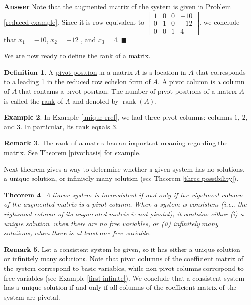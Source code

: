 \documentclass[12pt,letterpaper]{book}
\numberwithin{equation}{section}
\newtheorem{thm}{\textbf{Theorem}}[section]
\theoremstyle{definition}
\newtheorem{defi}[thm]{\textbf{Definition}}
\newtheorem{example}[thm]{\textbf{Example}}
\newtheorem{remark}[thm]{\textbf{Remark}}
\newenvironment{answer}{\noindent\textbf{Answer}}{\hfill$\blacksquare$\vspace{0.1in}}
\newcommand{\rank}{\operatorname{rank}}
\begin{document}
\begin{answer}
Note that the augmented matrix of the system is given in Problem \ref{reduced example}. Since it is row equivalent to $\left[\begin{array}{rrrr}1 & 0 & 0 & -10 \\ 0 & 1 & 0 & -12 \\ 0 & 0 & 1 & 4 \end{array}\right]$, we conclude that $x_1=-10$, $x_2=-12$ , and $x_3=4$.
\end{answer}

We are now ready to define the rank of a matrix.

\begin{defi}\label{rank def defi} A \underline{pivot position} in a matrix $A$ is
a location in $A$ that corresponds to a leading 1 in the reduced row
echelon form of $A$. A \underline{pivot column} is a
column of $A$ that contains a pivot position. The number of pivot positions of a matrix $A$ is
called the \underline{rank} of $A$ and denoted by
$\rank (A)$.
\end{defi}

\begin{example} In Example \ref{unique rref}, we had three pivot
columns: columns $1$, $2$, and $3$. In particular, its rank equals $3$.
\end{example}

\begin{remark}
The rank of a matrix has an important meaning regarding the matrix. See Theorem \ref{pivotbasis} for example.
\end{remark}

Next theorem gives a way to determine whether a given system has no solutions, a unique solution, or infinitely many solution (see Theorem \ref{three possibility}).

\begin{thm}\label{criterion} A linear system is inconsistent if and only if the
rightmost column of the augmented matrix is a pivot column. When a
system is consistent (i.e., the rightmost column of its augmented
matrix is not pivotal), it contains either (i) a unique solution,
when there are no free variables, or (ii) infinitely many solutions,
when there is at least one free variable.
\end{thm}

\begin{remark}\label{criterion remark}
Let a consistent system be given, so it has either a unique solution or infinitely many solutions. Note that pivot columns of the coefficient matrix of the system correspond to basic variables, while non-pivot columns correspond to free variables (see Example \ref{first infinite}). We conclude that a consistent system has a unique solution if and only if all columns of the coefficient matrix of the system are pivotal.
\end{remark}
\end{document}
